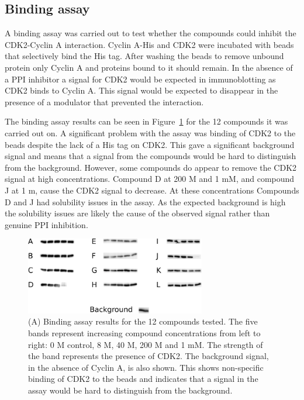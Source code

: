 \subsection{Binding assay}

A binding assay was carried out to test whether the compounds could inhibit the CDK2-Cyclin A interaction.
Cyclin A-His and CDK2 were incubated with beads that selectively bind the His tag.
After washing the beads to remove unbound protein only Cyclin A and proteins bound to it should remain.
In the absence of a PPI inhibitor a signal for CDK2 would be expected in immunoblotting as CDK2 binds to Cyclin A.
This signal would be expected to disappear in the presence of a modulator that prevented the interaction.

The binding assay results can be seen in Figure~\ref{fig:binding_assay} for the 12 compounds it was carried out on.
A significant problem with the assay was binding of CDK2 to the beads despite the lack of a His tag on CDK2.
This gave a significant background signal and means that a signal from the compounds would be hard to distinguish from the background.
However, some compounds do appear to remove the CDK2 signal at high concentrations.
Compound D at 200 \textmu M and 1 mM, and compound J at 1 m, cause the CDK2 signal to decrease.
At these concentrations Compounds D and J had solubility issues in the assay.
As the expected background is high the solubility issues are likely the cause of the observed signal rather than genuine PPI inhibition.

\begin{figure}
\centering

\includegraphics[width=0.7\textwidth]{figures/binding_assay/binding_assay}

\caption{(A) Binding assay results for the 12 compounds tested.
The five bands represent increasing compound concentrations from left to right: 0 M control, 8 \textmu M, 40 \textmu M, 200 \textmu M and 1 mM.
The strength of the band represents the presence of CDK2.
The background signal, in the absence of Cyclin A, is also shown.
This shows non-specific binding of CDK2 to the beads and indicates that a signal in the assay would be hard to distinguish from the background.}

\label{fig:binding_assay}
\end{figure}


